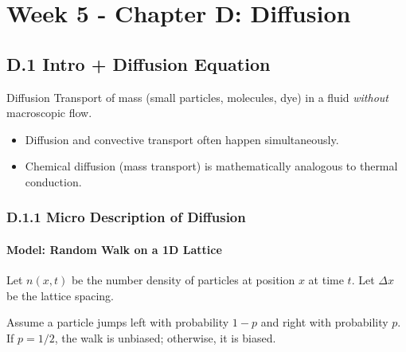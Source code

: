 \section{Week 5 - Chapter D: Diffusion}

\subsection{D.1 Intro + Diffusion Equation}

\begin{defbox}{Diffusion}
Transport of mass (small particles, molecules, dye) in a fluid \textit{without} macroscopic flow.
\end{defbox}

\begin{notebox}[Remarks]
\begin{itemize}
    \item Diffusion and convective transport often happen simultaneously.
    \item Chemical diffusion (mass transport) is mathematically analogous to thermal conduction.
\end{itemize}
\end{notebox}

\subsubsection{D.1.1 Micro Description of Diffusion}

\paragraph{Model: Random Walk on a 1D Lattice}
Let $n(x,t)$ be the number density of particles at position $x$ at time $t$. Let $\Delta x$ be the lattice spacing.

\begin{center}
\end{center}

Assume a particle jumps left with probability $1-p$ and right with probability $p$. If $p=1/2$, the walk is unbiased; otherwise, it is biased.


